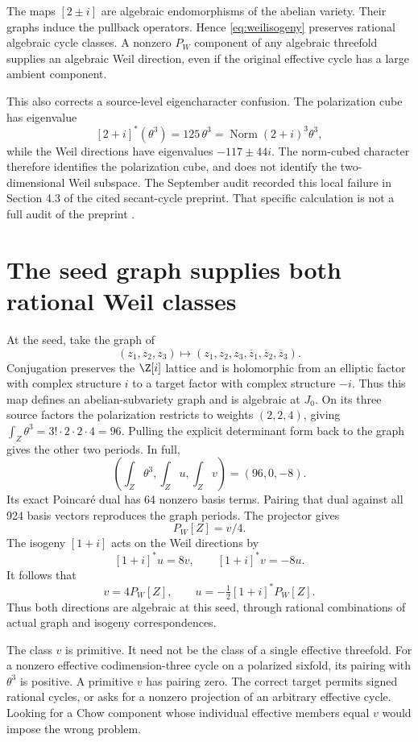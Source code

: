 The maps $[2\pm i]$ are algebraic endomorphisms of the abelian variety. Their graphs induce the pullback operators. Hence \eqref{eq:weilisogeny} preserves rational algebraic cycle classes. A nonzero $P_W$ component of any algebraic threefold supplies an algebraic Weil direction, even if the original effective cycle has a large ambient component.

This also corrects a source-level eigencharacter confusion. The polarization cube has eigenvalue
\[
[2+i]^*(\theta^3)=125\,\theta^3=\operatorname{Norm}(2+i)^3\theta^3,
\]
while the Weil directions have eigenvalues $-117\pm44i$. The norm-cubed character therefore identifies the polarization cube, and does not identify the two-dimensional Weil subspace. The September audit recorded this local failure in Section 4.3 of the cited secant-cycle preprint. That specific calculation is not a full audit of the preprint \cite{SecantPreprintAudit}.

\section{The seed graph supplies both rational Weil classes}
At the seed, take the graph of
\[
(z_1,z_2,z_3)\longmapsto
(z_1,z_2,z_3,\overline z_1,\overline z_2,\overline z_3).
\]
Conjugation preserves the $\Z[i]$ lattice and is holomorphic from an elliptic factor with complex structure $i$ to a target factor with complex structure $-i$. Thus this map defines an abelian-subvariety graph and is algebraic at $J_0$. On its three source factors the polarization restricts to weights $(2,2,4)$, giving $\int_Z\theta^3=3!\cdot2\cdot2\cdot4=96$. Pulling the explicit determinant form back to the graph gives the other two periods. In full,
\[
\left(\int_Z\theta^3,\int_Zu,\int_Zv\right)=(96,0,-8).
\]
Its exact Poincaré dual has 64 nonzero basis terms. Pairing that dual against all 924 basis vectors reproduces the graph periods. The projector gives
\[
P_W[Z]=v/4.
\]
The isogeny $[1+i]$ acts on the Weil directions by
\[
[1+i]^*u=8v,\qquad[1+i]^*v=-8u.
\]
It follows that
\[
v=4P_W[Z],\qquad
u=-\tfrac12[1+i]^*P_W[Z].
\]
Thus both directions are algebraic at this seed, through rational combinations of actual graph and isogeny correspondences.

The class $v$ is primitive. It need not be the class of a single effective threefold. For a nonzero effective codimension-three cycle on a polarized sixfold, its pairing with $\theta^3$ is positive. A primitive $v$ has pairing zero. The correct target permits signed rational cycles, or asks for a nonzero projection of an arbitrary effective cycle. Looking for a Chow component whose individual effective members equal $v$ would impose the wrong problem.

